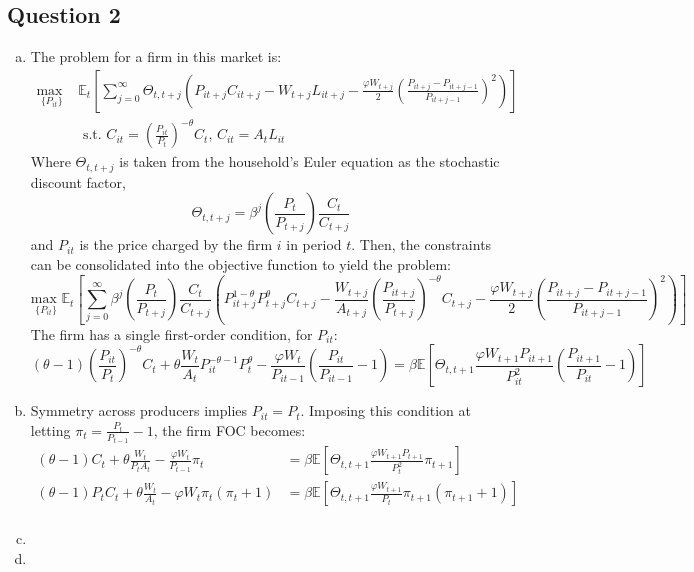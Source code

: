 \documentclass{article}
\newcommand{\usmax}[1]{\underset{#1}{\text{max }}}
\newcommand{\E}[1]{\mathbb{E}\left[#1\right]} %
\newcommand{\Et}[1]{\mathbb{E}_t\left[#1\right]}
\begin{document}
\pagebreak
\subsection*{Question 2}

\begin{enumerate}[(a)]

	\item The problem for a firm in this market is:
		{\small \begin{align*}
			\usmax{\{P_{it}\}}&\Et{\sum_{j=0}^\infty\Theta_{t,t+j}\left(P_{it+j}C_{it+j}-W_{t+j}L_{it+j} - \frac{\varphi W_{t+j}}{2}\left(\frac{P_{it+j}-P_{it+j-1}}{P_{it+j-1}}\right)^2\right)}	\\
				&\text{ s.t. } C_{it} = \left(\frac{P_{it}}{P_t}\right)^{-\theta}C_t\text{, }C_{it}=A_tL_{it}
		\end{align*} }
		Where $\Theta_{t,t+j}$ is taken from the household's Euler equation as the stochastic discount factor,
		\[
			\Theta_{t,t+j} = \beta^j\left(\frac{P_t}{P_{t+j}}\right)\frac{C_t}{C_{t+j}}
		\]
		and $P_{it}$ is the price charged by the firm $i$ in period $t$. Then, the constraints can be consolidated into the objective function to yield the problem:
		{\tiny \[
			\usmax{\{P_{it}\}}\Et{\sum_{j=0}^\infty\beta^j\left(\frac{P_t}{P_{t+j}}\right)\frac{C_t}{C_{t+j}}
				\left(P_{it+j}^{1-\theta}P_{t+j}^\theta C_{t+j}-\frac{W_{t+j}}{A_{t+j}}\left(\frac{P_{it+j}}{P_{t+j}}\right)^{-\theta}C_{t+j}-\frac{\varphi W_{t+j}}{2}\left(\frac{P_{it+j}-P_{it+j-1}}{P_{it+j-1}}\right)^2\right)}
		\] }
		The firm has a single first-order condition, for $P_{it}$:
		{\footnotesize \[
			(\theta-1)\left(\frac{P_{it}}{P_t}\right)^{-\theta}C_t + \theta\frac{W_t}{A_t}P_{it}^{-\theta-1}P_t^\theta - 
				\frac{\varphi W_t}{P_{it-1}}\left(\frac{P_{it}}{P_{it-1}} - 1\right)
			= \beta\E{\Theta_{t,t+1}\frac{\varphi W_{t+1}P_{it+1}}{P_{it}^2}\left(\frac{P_{it+1}}{P_{it}}-1\right)}
		\] }
		
	\item Symmetry across producers implies ${P_{it}=P_t}$. Imposing this condition at letting ${\pi_t=\frac{P_t}{P_{t-1}}-1}$, the firm FOC becomes:
		\begin{align*}
			(\theta-1)C_t + \theta\frac{W_t}{P_tA_t} - \frac{\varphi W_t}{P_{t-1}}\pi_t
				&= \beta\E{\Theta_{t,t+1}\frac{\varphi W_{t+1}P_{t+1}}{P_{t}^2}\pi_{t+1}}	\\
			(\theta-1)P_tC_t + \theta\frac{W_t}{A_t} - \varphi W_t\pi_t(\pi_t+1)
				&= \beta\E{\Theta_{t,t+1}\frac{\varphi W_{t+1}}{P_{t}}\pi_{t+1}(\pi_{t+1}+1)}	\\
		\end{align*}
	
	\item 
	
	\item 
	
	
\end{enumerate}
\end{document}

